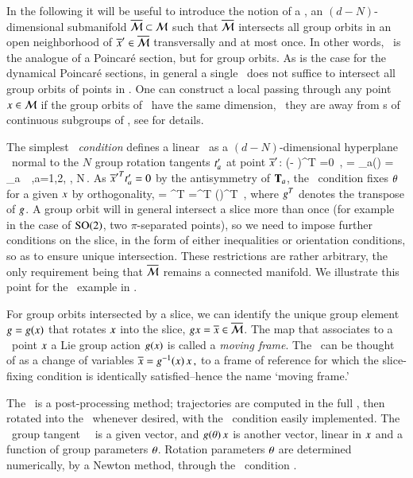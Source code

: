 \documentclass[preprint,number,sort&compress]{elsarticle}
\begin{document}
In the following it will be useful to introduce the notion of
a \emph{\slice}, an $(d-N)$-dimensional submanifold
$\overline{\cal M}\subset{\cal M}$ such that $\overline{\cal M}$ intersects all group
orbits in an open neighborhood of ${\overline{x}'} \in \overline{\cal M}$
transversally and at most once. In other words, \slice\ is
the analogue of a Poincar\'e section, but for group orbits.
As is the case for the dynamical Poincar\'e sections, in
general a single \slice\ does not suffice to intersect all
group orbits of points in \pS. One can construct a local {\slice} passing
through any point $x\in {\cal M}$ if the group orbits of \Group\
have the same dimension, \ie\ {they are} away from {\fixedsp
s} of continuous subgroups of \Group, see
 for details.

The simplest {\em \slice\ condition} defines a linear \slice\ as a
$(d\!-\!N)$-dim\-ens\-ion\-al hyperplane \pSRed\ normal to
the $N$ group rotation tangents $t'_{a}$ at point ${\overline{x}'}$:
\beq
(\sspRed - \slicep )^T  =0
    \,,\qquad
{} = \groupTan_a(\slicep) = \Lg_a \, \slicep
\,,\qquad a=1,2, \cdots, N\,.
As ${\overline{x}'}^T t'_{a} =0$ by the antisymmetry of
$\mathbf{T}_a$, the \slice\ condition  fixes
${\bf \theta}$ for a given $x$ by orthogonality,
 = \sspRed^T  
	=\ssp^T  \LieEl(\gSpace)^T \sliceTan{a}
\,,
where $g^T$ denotes the transpose of $g$. A group
orbit will in general intersect a slice more than once (for
example in the case of $\textrm{SO}(2)$, two $\pi$-separated
points), so we need to impose further conditions on the
slice, in the form of either inequalities or orientation
conditions, so as to ensure unique intersection. These
restrictions are rather arbitrary, the only requirement being
that $\overline{\cal M}$ remains a connected manifold. We illustrate
this point for the \cLf\ example in .

For group orbits intersected by a slice, we can identify the
unique group element $g=g(x)$ that rotates
$x$ into the slice, $gx = \overline{x} \in \overline{\cal M}$. The
map that associates to a \statesp\ point $x$ a Lie group
action $g(x)$ is called a \emph{moving frame}.
The \mframes\ can be thought of as a change of variables
$
\overline{x} = g^{-1}(x) \, x
\,,
$%
to a frame of reference for which the slice-fixing condition
 is identically satisfied--hence the name
`moving frame.'

The \mframes\ is a post-processing method; trajectories are
computed in the full \statesp, then rotated into the \slice\
whenever desired, with the \slice\ condition easily
implemented. The \slice\ group tangent \sliceTan\ \, is a given
vector, and $g({\bf \theta})\,x$ is
another vector, linear in $x$ and a function of group
parameters ${\bf \theta}$. Rotation parameters ${\bf \theta}$ are
determined numerically, by a Newton method, through the \slice\
condition .
\end{document}
